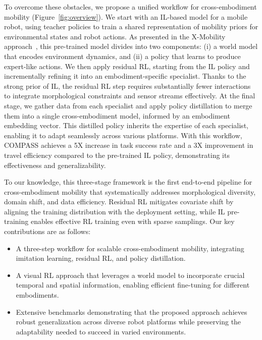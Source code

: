 \documentclass[letterpaper, 10 pt,conference]{ieeeconf}
\begin{document}
To overcome these obstacles, we propose a unified workflow for cross-embodiment mobility (Figure~\ref{fig:overview}). We start with an IL-based model for a mobile robot, using teacher policies to train a shared representation of mobility priors for environmental states and robot actions. As presented in the X-Mobility approach~\cite{liu2024x}, this pre-trained model divides into two components: (i) a world model that encodes environment dynamics, and (ii) a policy that learns to produce expert-like actions. We then apply residual RL, starting from the IL policy and incrementally refining it into an embodiment-specific specialist. Thanks to the strong prior of IL, the residual RL step requires substantially fewer interactions to integrate morphological constraints and sensor streams effectively. At the final stage, we gather data from each specialist and apply policy distillation to merge them into a single cross-embodiment model, informed by an embodiment embedding vector. This distilled policy inherits the expertise of each specialist, enabling it to adapt seamlessly across various platforms. With this workflow, COMPASS achieves a 5X increase in task success rate and a 3X improvement in travel efficiency compared to the pre-trained IL policy, demonstrating its effectiveness and generalizability.

To our knowledge, this three-stage framework is the first end-to-end pipeline for cross-embodiment mobility that systematically addresses morphological diversity, domain shift, and data efficiency. Residual RL mitigates covariate shift by aligning the training distribution with the deployment setting, while IL pre-training enables effective RL training even with sparse samplings. Our key contributions are as follows:
\begin{itemize}
    \item A three-step workflow for scalable cross-embodiment mobility, integrating imitation learning, residual RL, and policy distillation.
    \item A visual RL approach that leverages a world model to incorporate crucial temporal and spatial information, enabling efficient fine-tuning for different embodiments.
    \item Extensive benchmarks demonstrating that the proposed approach achieves robust generalization across diverse robot platforms while preserving the adaptability needed to succeed in varied environments.
\end{itemize}


\end{document}
